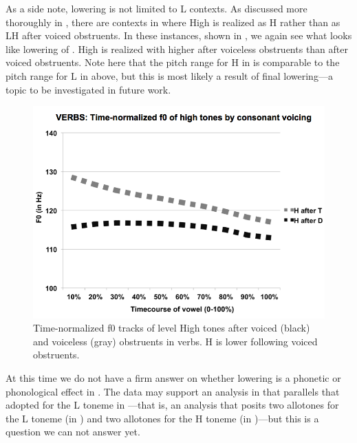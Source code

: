 \documentclass[output=paper,newtxmath,modfonts,nonflat]{langsci/langscibook}
\begin{document}
As a side note,   lowering is not limited to L  contexts. As discussed more thoroughly in , there are contexts in  where High  is realized as H rather than as LH after voiced obstruents. In these instances, shown in , we again see what looks like  lowering of . High  is realized with higher  after voiceless obstruents than after voiced obstruents. Note here that the pitch range for H  in  is comparable to the pitch range for L  in  above, but this is most likely a result of final lowering—a topic to be investigated in future work. 

  
\begin{figure}
\includegraphics[width=\textwidth]{figures/Lotven-img6.png}
\caption{\label{fig:lotven:5} Time-normalized f0 tracks of level High tones after voiced (black) and voiceless (gray) obstruents in verbs. H is lower following voiced obstruents.}
\end{figure}


At this time we do not have a firm answer on whether   lowering is a phonetic or phonological effect in . The data may support an analysis in  that parallels that adopted for the L toneme in —that is, an analysis that posits two allotones for the L toneme (in ) and two allotones for the H toneme (in )—but this is a question we can not answer yet. 
\end{document}

